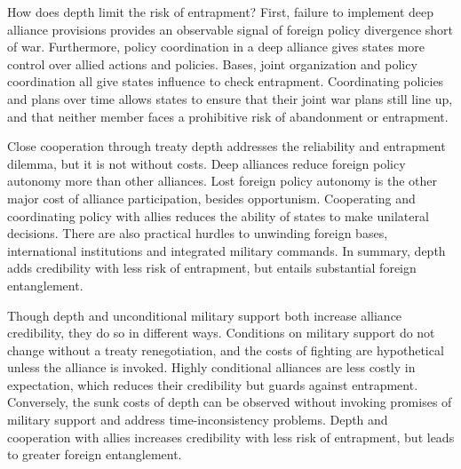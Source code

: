 \documentclass[12pt]{article}
\begin{document}
How does depth limit the risk of entrapment?   
First, failure to implement deep alliance provisions provides an observable signal of foreign policy divergence short of war.
Furthermore, policy coordination in a deep alliance gives states more control over allied actions and policies. 
Bases, joint organization and policy coordination all give states influence to check entrapment.
Coordinating policies and plans over time allows states to ensure that their joint war plans still line up, and that neither member faces a prohibitive risk of abandonment or entrapment.  


Close cooperation through treaty depth addresses the reliability and entrapment dilemma, but it is not without costs. 
Deep alliances reduce foreign policy autonomy more than other alliances.
Lost foreign policy autonomy is the other major cost of alliance participation, besides opportunism. 
Cooperating and coordinating policy with allies reduces the ability of states to make unilateral decisions. 
There are also practical hurdles to unwinding foreign bases, international institutions and integrated military commands. 
In summary, depth adds credibility with less risk of entrapment, but entails substantial foreign entanglement. 


Though depth and unconditional military support both increase alliance credibility, they do so in different ways. 
Conditions on military support do not change without a treaty renegotiation, and the costs of fighting are hypothetical unless the alliance is invoked.  
Highly conditional alliances are less costly in expectation, which reduces their credibility but guards against entrapment. 
Conversely, the sunk costs of depth can be observed without invoking promises of military support and address time-inconsistency problems.
Depth and cooperation with allies increases credibility with less risk of entrapment, but leads to greater foreign entanglement.   
\end{document}
